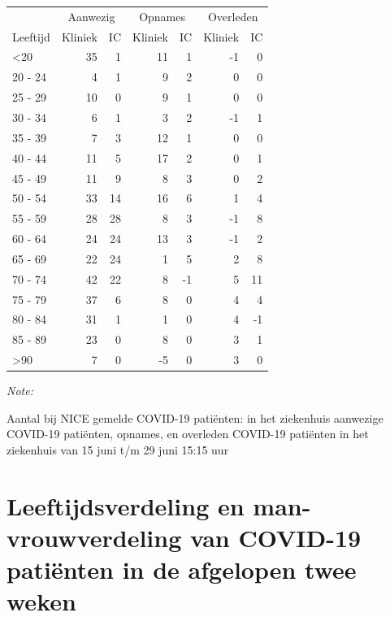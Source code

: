 \documentclass[
  english,
  man,floatsintext]{apa6}
\begin{document}
\begin{table}
\centering\begingroup\fontsize{10}{12}\selectfont

\begin{threeparttable}
\begin{tabular}{lrrrrrr}
\toprule
\multicolumn{1}{c}{ } & \multicolumn{2}{c}{Aanwezig} & \multicolumn{2}{c}{Opnames} & \multicolumn{2}{c}{Overleden} \\
\cmidrule(l{3pt}r{3pt}){2-3} \cmidrule(l{3pt}r{3pt}){4-5} \cmidrule(l{3pt}r{3pt}){6-7}
Leeftijd & Kliniek & IC & Kliniek & IC & Kliniek & IC\\
\midrule
<20 & 35 & 1 & 11 & 1 & -1 & 0\\
20 - 24 & 4 & 1 & 9 & 2 & 0 & 0\\
25 - 29 & 10 & 0 & 9 & 1 & 0 & 0\\
30 - 34 & 6 & 1 & 3 & 2 & -1 & 1\\
35 - 39 & 7 & 3 & 12 & 1 & 0 & 0\\
40 - 44 & 11 & 5 & 17 & 2 & 0 & 1\\
45 - 49 & 11 & 9 & 8 & 3 & 0 & 2\\
50 - 54 & 33 & 14 & 16 & 6 & 1 & 4\\
55 - 59 & 28 & 28 & 8 & 3 & -1 & 8\\
60 - 64 & 24 & 24 & 13 & 3 & -1 & 2\\
65 - 69 & 22 & 24 & 1 & 5 & 2 & 8\\
70 - 74 & 42 & 22 & 8 & -1 & 5 & 11\\
75 - 79 & 37 & 6 & 8 & 0 & 4 & 4\\
80 - 84 & 31 & 1 & 1 & 0 & 4 & -1\\
85 - 89 & 23 & 0 & 8 & 0 & 3 & 1\\
>90 & 7 & 0 & -5 & 0 & 3 & 0\\
\bottomrule
\end{tabular}
\begin{tablenotes}
\item \textit{Note: } 
\item Aantal bij NICE gemelde COVID-19 patiënten: in het ziekenhuis aanwezige COVID-19 patiënten, opnames, en overleden COVID-19 patiënten in het ziekenhuis van 15 juni t/m 29 juni 15:15 uur
\end{tablenotes}
\end{threeparttable}
\endgroup{}
\end{table}

\newpage

\hypertarget{leeftijdsverdeling-en-man-vrouwverdeling-van-covid-19-patiuxebnten-in-de-afgelopen-twee-weken}{%
\section{Leeftijdsverdeling en man-vrouwverdeling van COVID-19 patiënten in de afgelopen twee weken}\label{leeftijdsverdeling-en-man-vrouwverdeling-van-covid-19-patiuxebnten-in-de-afgelopen-twee-weken}}
\end{document}
